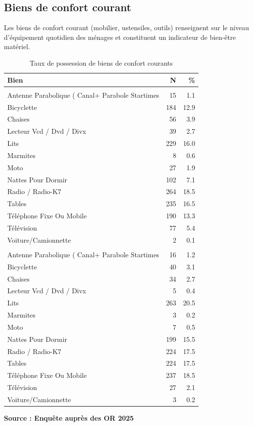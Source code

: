 \documentclass[
  french,
  letterpaper,
]{report}
\begin{document}
\subsection{Biens de confort courant}\label{biens-de-confort-courant}

Les biens de confort courant (mobilier, ustensiles, outils) renseignent
sur le niveau d'équipement quotidien des ménages et constituent un
indicateur de bien-être matériel.

\begin{table}
\caption*{
{\fontsize{20}{25}\selectfont  Taux de possession de biens de confort courants\fontsize{12}{15}\selectfont }
} 
\fontsize{12.0pt}{14.0pt}\selectfont
\begin{tabular*}{\linewidth}{@{\extracolsep{\fill}}lrr}
\toprule
Bien & N & \% \\ 
\midrule\addlinespace[2.5pt]
\multicolumn{3}{l}{{\bfseries {Alaotra}}} \\[2.5pt] 
\midrule\addlinespace[2.5pt]
Antenne Parabolique ( Canal+ Parabole Startimes & 15 & 1.1 \\ 
Bicyclette & 184 & 12.9 \\ 
Chaises & 56 & 3.9 \\ 
Lecteur Vcd / Dvd / Divx & 39 & 2.7 \\ 
Lits & 229 & 16.0 \\ 
Marmites & 8 & 0.6 \\ 
Moto & 27 & 1.9 \\ 
Nattes Pour Dormir & 102 & 7.1 \\ 
Radio / Radio-K7 & 264 & 18.5 \\ 
Tables & 235 & 16.5 \\ 
Téléphone Fixe Ou Mobile & 190 & 13.3 \\ 
Télévision & 77 & 5.4 \\ 
Voiture/Camionnette & 2 & 0.1 \\ 
\midrule\addlinespace[2.5pt]
\multicolumn{3}{l}{{\bfseries {Marovoay}}} \\[2.5pt] 
\midrule\addlinespace[2.5pt]
Antenne Parabolique ( Canal+ Parabole Startimes & 16 & 1.2 \\ 
Bicyclette & 40 & 3.1 \\ 
Chaises & 34 & 2.7 \\ 
Lecteur Vcd / Dvd / Divx & 5 & 0.4 \\ 
Lits & 263 & 20.5 \\ 
Marmites & 3 & 0.2 \\ 
Moto & 7 & 0.5 \\ 
Nattes Pour Dormir & 199 & 15.5 \\ 
Radio / Radio-K7 & 224 & 17.5 \\ 
Tables & 224 & 17.5 \\ 
Téléphone Fixe Ou Mobile & 237 & 18.5 \\ 
Télévision & 27 & 2.1 \\ 
Voiture/Camionnette & 3 & 0.2 \\ 
\bottomrule
\end{tabular*}
\begin{minipage}{\linewidth}
\textbf{Source : Enquête auprès des OR 2025}\\
\end{minipage}
\end{table}
\end{document}
